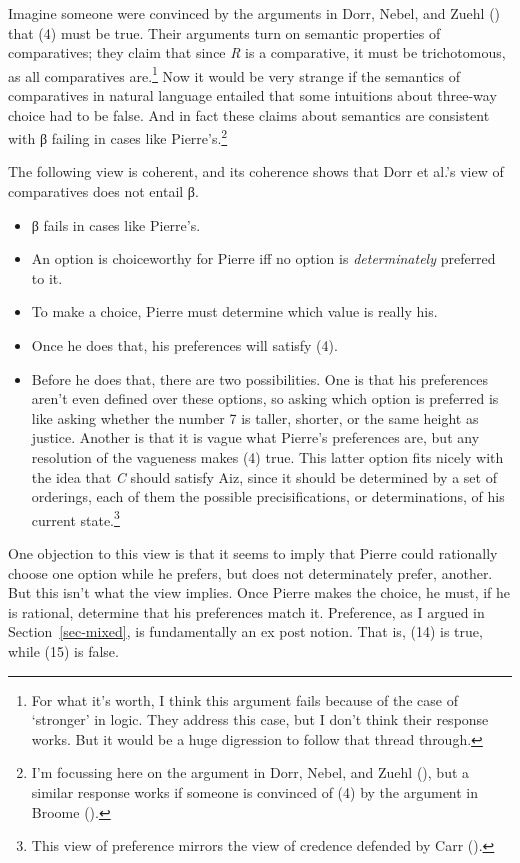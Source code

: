 \documentclass[
  11pt,
  letterpaper,
  DIV=11,
  numbers=noendperiod,
  twoside]{scrartcl}
\providecommand{\tightlist}{%
  \setlength{\itemsep}{0pt}\setlength{\parskip}{0pt}}
\begin{document}
Imagine someone were convinced by the arguments in Dorr, Nebel, and
Zuehl () that (4) must be true. Their
arguments turn on semantic properties of comparatives; they claim that
since \emph{R} is a comparative, it must be trichotomous, as all
comparatives are.\footnote{For what it's worth, I think this argument
  fails because of the case of `stronger' in logic. They address this
  case, but I don't think their response works. But it would be a huge
  digression to follow that thread through.} Now it would be very
strange if the semantics of comparatives in natural language entailed
that some intuitions about three-way choice had to be false. And in fact
these claims about semantics are consistent with β failing in cases like
Pierre's.\footnote{I'm focussing here on the argument in Dorr, Nebel,
  and Zuehl (), but a similar response
  works if someone is convinced of (4) by the argument in Broome
  ().}

The following view is coherent, and its coherence shows that Dorr et
al.'s view of comparatives does not entail β.

\begin{itemize}
\tightlist
\item
  β fails in cases like Pierre's.
\item
  An option is choiceworthy for Pierre iff no option is
  \emph{determinately} preferred to it.
\item
  To make a choice, Pierre must determine which value is really his.
\item
  Once he does that, his preferences will satisfy (4).
\item
  Before he does that, there are two possibilities. One is that his
  preferences aren't even defined over these options, so asking which
  option is preferred is like asking whether the number 7 is taller,
  shorter, or the same height as justice. Another is that it is vague
  what Pierre's preferences are, but any resolution of the vagueness
  makes (4) true. This latter option fits nicely with the idea that
  \emph{C} should satisfy Aiz, since it should be determined by a set of
  orderings, each of them the possible precisifications, or
  determinations, of his current state.\footnote{This view of preference
    mirrors the view of credence defended by Carr
    ().}
\end{itemize}

One objection to this view is that it seems to imply that Pierre could
rationally choose one option while he prefers, but does not
determinately prefer, another. But this isn't what the view implies.
Once Pierre makes the choice, he must, if he is rational, determine that
his preferences match it. Preference, as I argued in
Section~\ref{sec-mixed}, is fundamentally an ex post notion. That is,
(14) is true, while (15) is false.
\end{document}
